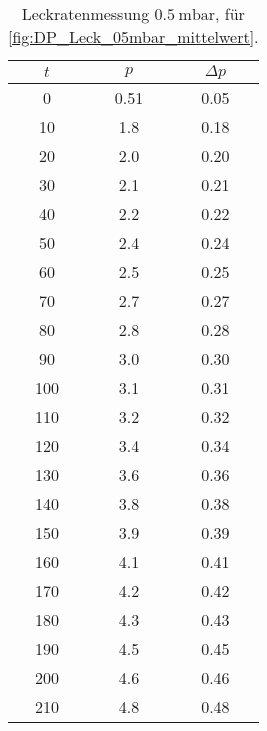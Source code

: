 \begin{table}[H]
    \centering
    \caption{Leckratenmessung $\SI{0.5}{\milli\bar}$, für  \autoref{fig:DP_Leck_05mbar_mittelwert}.}
    \label{tab:}
    \begin{tabular}{c c c}
        \toprule
        {$t$} & {$p$} & {$\Delta p$} \\
        \midrule
        0 & 0.51 & 0.05\\
        10 & 1.8 & 0.18\\
        20 & 2.0 & 0.20\\
        30 & 2.1 & 0.21\\
        40 & 2.2 & 0.22\\
        50 & 2.4 & 0.24\\
        60 & 2.5 & 0.25\\
        70 & 2.7 & 0.27\\
        80 & 2.8 & 0.28\\
        90 & 3.0 & 0.30\\
        100 & 3.1 & 0.31\\
        110 & 3.2 & 0.32\\
        120 & 3.4 & 0.34\\
        130 & 3.6 & 0.36\\
        140 & 3.8 & 0.38\\
        150 & 3.9 & 0.39\\
        160 & 4.1 & 0.41\\
        170 & 4.2 & 0.42\\
        180 & 4.3 & 0.43\\
        190 & 4.5 & 0.45\\
        200 & 4.6 & 0.46\\
        210 & 4.8 & 0.48\\
        \bottomrule
    \end{tabular}
\end{table}

